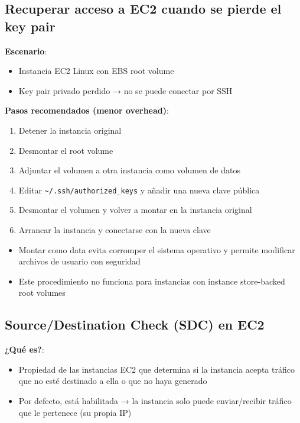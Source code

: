 \documentclass[12pt,a4paper]{report}
\begin{document}
\subsection{Recuperar acceso a EC2 cuando se pierde el key pair}

\textbf{Escenario}:
\begin{itemize}
    \item Instancia EC2 Linux con EBS root volume
    \item Key pair privado perdido → no se puede conectar por SSH
\end{itemize}

\textbf{Pasos recomendados (menor overhead)}:
\begin{enumerate}
    \item Detener la instancia original
    \item Desmontar el root volume
    \item Adjuntar el volumen a otra instancia como volumen de datos
    \item Editar \texttt{\~{}/.ssh/authorized\_keys} y añadir una nueva clave pública
    \item Desmontar el volumen y volver a montar en la instancia original
    \item Arrancar la instancia y conectarse con la nueva clave
\end{enumerate}

\begin{warningbox}
\begin{itemize}
    \item Montar como data evita corromper el sistema operativo y permite modificar archivos de usuario con seguridad
    \item Este procedimiento no funciona para instancias con instance store-backed root volumes
\end{itemize}
\end{warningbox}

\subsection{Source/Destination Check (SDC) en EC2}

\textbf{¿Qué es?}:
\begin{itemize}
    \item Propiedad de las instancias EC2 que determina si la instancia acepta tráfico que no esté destinado a ella o que no haya generado
    \item Por defecto, está habilitada → la instancia solo puede enviar/recibir tráfico que le pertenece (su propia IP)
\end{itemize}
\end{document}
